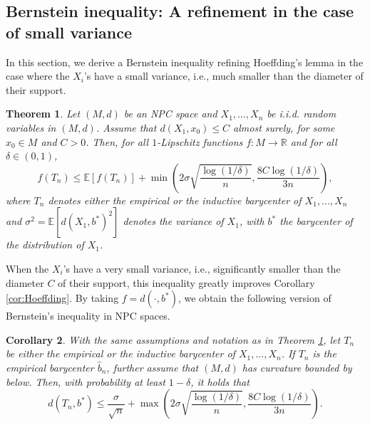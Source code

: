 \documentclass[10pt,a4paper]{article}
\theoremstyle{plain}
\newtheorem{theorem}{Theorem}[section]
\newtheorem{corollary}[theorem]{Corollary}
\theoremstyle{definition}
\theoremstyle{remark}
\newcommand{\R}{\mathbb{R}}
\newcommand{\E}{\mathbb{E}}
\begin{document}
\subsection{Bernstein inequality: A refinement in the case of small variance} \label{sec:Bernstein}

In this section, we derive a Bernstein inequality refining Hoeffding's lemma in the case where the $X_i$'s have a small variance, i.e., much smaller than the diameter of their support. 

\begin{theorem}\label{thmbernstein}
Let $(M,d)$ be an NPC space and $X_1,\ldots,X_n$ be i.i.d. random variables in $(M,d)$. Assume that $d(X_1,x_0)\leq C$ almost surely, for some $x_0\in M$ and $C>0$. Then, for all $1$-Lipschitz functions $f:M\to\R$ and for all $\delta\in (0,1)$,
$$f(T_n)\leq \E[f(T_n)]+\min\left(2\sigma\sqrt{\frac{\log(1/\delta)}{n}},\frac{8C\log(1/\delta)}{3n}\right),$$
where $T_n$ denotes either the empirical or the inductive barycenter of $X_1,...,X_n$ and $\sigma^2=\E[d(X_1,b^*)^2]$ denotes the variance of $X_1$, with $b^*$ the barycenter of the distribution of $X_1$.
\end{theorem}

When the $X_i$'s have a very small variance, i.e., significantly smaller than the diameter $C$ of their support, this inequality greatly improves Corollary \ref{cor:Hoeffding}. By taking $f=d(\cdot,b^*)$, we obtain the following version of Bernstein's inequality in NPC spaces.

\begin{corollary} \label{cor:bernstein}
    With the same assumptions and notation as in Theorem \ref{thmbernstein}, let $T_n$ be either the empirical or the inductive barycenter of $X_1,\ldots,X_n$. If $T_n$ is the empirical barycenter $\hat b_n$, further assume that $(M,d)$ has curvature bounded by below. Then, with probability at least $1-\delta$, it holds that 
    $$d(T_n,b^*)\leq \frac{\sigma}{\sqrt{n}}+\max\left(2\sigma\sqrt{\frac{\log(1/\delta)}{n}},\frac{8C\log(1/\delta)}{3n}\right).$$
    
\end{corollary}
\end{document}
